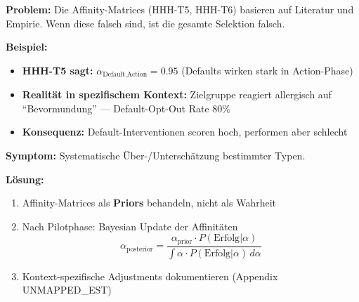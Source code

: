 \begin{tcolorbox}[colback=red!5!white, colframe=red!75!black,
    title=\textbf{Failure Mode 2: Affinity-Matrix-Fehler}]

\textbf{Problem:} Die Affinity-Matrices (HHH-T5, HHH-T6) basieren auf Literatur und Empirie. Wenn diese falsch sind, ist die gesamte Selektion falsch.

\medskip
\textbf{Beispiel:}
\begin{itemize}[nosep]
    \item \textbf{HHH-T5 sagt:} $\alpha_{\text{Default}, \text{Action}} = 0.95$ (Defaults wirken stark in Action-Phase)
    \item \textbf{Realität in spezifischem Kontext:} Zielgruppe reagiert allergisch auf ``Bevormundung'' --- Default-Opt-Out Rate 80\%
    \item \textbf{Konsequenz:} Default-Interventionen scoren hoch, performen aber schlecht
\end{itemize}

\medskip
\textbf{Symptom:} Systematische Über-/Unterschätzung bestimmter Typen.

\textbf{Lösung:}
\begin{enumerate}[nosep]
    \item Affinity-Matrices als \textbf{Priors} behandeln, nicht als Wahrheit
    \item Nach Pilotphase: Bayesian Update der Affinitäten
    \begin{equation*}
    \alpha_{\text{posterior}} = \frac{\alpha_{\text{prior}} \cdot P(\text{Erfolg}|\alpha)}{\int \alpha \cdot P(\text{Erfolg}|\alpha) \, d\alpha}
    \end{equation*}
    \item Kontext-spezifische Adjustments dokumentieren (Appendix UNMAPPED_EST)
\end{enumerate}

\end{tcolorbox}

